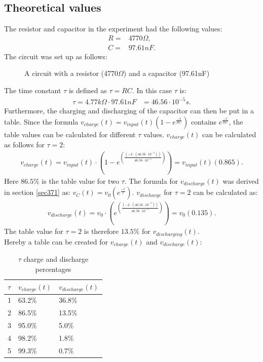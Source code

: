 \subsection{Theoretical values}
The resistor and capacitor in the experiment had the following values:
\begin{align*}
 R =& 4770\Omega, \\
 C =& 97.61nF.
\end{align*}
The circuit was set up as follows:
\begin{figure}[H]
	
	\caption{A circuit with a resistor (4770$\Omega$) and a capacitor (97.61nF)}
\end{figure}
\noindent The time constant $\tau$ is defined as $\tau = RC$. In this case $\tau$ is:
\begin{align}
	\tau = 4.77 k\Omega \cdot 97.61 nF &= 46.56 \cdot 10^{-5} s. \label{eq:tau}
\end{align}
Furthermore, the charging and discharging of the capacitor can then be put in a table. Since the formula $v_{charge}(t)=v_{input}(t)\left(1-e^{\frac{-t}{RC}}\right)$ contains $e^{\frac{-t}{RC}}$, the table values can be calculated for different $\tau$ values. $v_{charge}(t)$ can be calculated as follows for $\tau = 2$: 
\begin{align*}
v_{charge}(t)=v_{input}(t) \cdot \left(1-e^{\left(\frac{\left(-2 \cdot \left(46.56 \cdot 10^{-5} \right)\right)}{46.56 \cdot 10^{-5}}\right)} \right) = v_{input}(t)(0.865).
\end{align*}
Here $86.5\%$ is the table value for two $\tau$. The formula for $v_{discharge}(t)$ was derived in section \ref{sec371} as: $v_{C}(t)=v_{0} \left(e^{\frac{-t}{\tau}} \right)$. $v_{discharge}$ for $\tau = 2$ can be calculated as:
\begin{align*}
v_{discharge}(t)=v_{0} \cdot \left(e^{\left(\frac{\left(-2 \cdot \left(46.56 \cdot 10^{-5} \right)\right)}{46.56 \cdot 10^{-5}}\right)} \right) = v_{0}(0.135).
\end{align*}
The table value for $\tau = 2$ is therefore $13.5 \%$ for $v_{discharging}(t)$. \\
Hereby a table can be created for $v_{charge}(t)$ and $v_{discharge}(t)$: \\
\begin{table}[H]
\center
\begin{tabular}{|l|l|l|}
\hline
$\tau$ & $v_{charge}(t)$ & $v_{discharge}(t)$ \\ \hline
1      & 63.2\%       & 36.8\%         \\ \hline
2      & 86.5\%       & 13.5\%         \\ \hline
3      & 95.0\%       & 5.0\%          \\ \hline
4      & 98.2\%       & 1.8\%          \\ \hline
5      & 99.3\%       & 0.7\%          \\ \hline
\end{tabular}
\caption{$\tau$ charge and discharge percentages}
\end{table}
